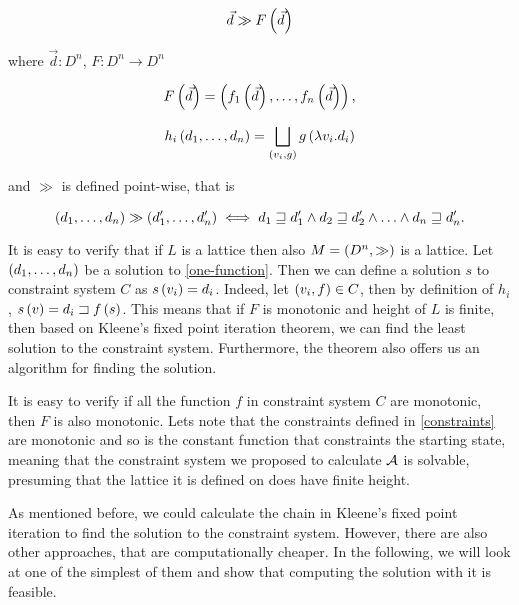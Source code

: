 \documentclass[..thesis.tex]{subfiles}
\begin{document}
\begin{equation}
  \label{one-function}
  \vec{d} \gg F \left( \vec{d}  \right) 
\end{equation}


where $\vec{d} : D^n$, $F :  D^{n} \to D^{n}$

\begin{equation*}
  F \left( \vec{d} \right)  = \left( f_1 \left( \vec{d} \right) , \ldots, f_n \left( \vec{d} \right) \right) \text{,}
\end{equation*}   


\begin{equation*}
  h_i \left( d_1, \ldots, d_n \right) = \bigsqcup_{\left( v_i, g \right)} g \left( \lambda v_i. d_i \right)
\end{equation*}

and $\gg$ is defined point-wise, that is 

\begin{equation*}
\left( d_1, \ldots, d_n \right) \gg \left( d_1', \ldots, d_n' \right) \iff  d_1 \sqsupseteq d_1' \land d_2 \sqsupseteq d_2' \land \ldots \land d_n \sqsupseteq d_n' \text{.}
\end{equation*}

It is easy to verify that if $L$ is a lattice then also $M = \left( D^n, \gg \right)$ is a lattice. Let $\left( d_1, \ldots, d_n \right) $ be a solution to \ref{one-function}. Then we can define a solution $s$ to constraint system $C$ as $s \left( v_i \right) = d_i$. Indeed, let $ \left( v_i, f \right) \in C$, then by definition of $h_i$, $s \left( v \right) = d_i \sqsupset f \left( s \right)$. This means that if $F$ is monotonic and height of $L$ is finite, then based on Kleene's fixed point iteration theorem, we can find the least solution to the constraint system. Furthermore, the theorem also offers us an algorithm for finding the solution.

It is easy to verify if all the function $f$ in constraint system $C$ are monotonic, then $F$ is also monotonic. Lets note that the constraints defined in \ref{constraints} are monotonic and so is the constant function that constraints the starting state, meaning that the constraint system we proposed to calculate $\mathcal{A}$ is solvable, presuming that the lattice it is defined on does have finite height.


As mentioned before, we could calculate the chain in Kleene's fixed point iteration to find the solution to the constraint system. However, there are also other approaches, that are computationally cheaper. In the following, we will look at one of the simplest of them and show that computing the solution with it is feasible.
\end{document}
